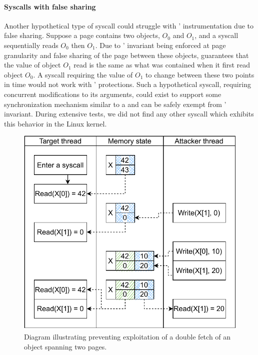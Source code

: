 \paragraph{Syscalls with false sharing}
Another hypothetical type of syscall could struggle with \midas'
instrumentation due to false sharing.
Suppose a page contains two objects, $O_0$ and $O_1$, and a syscall
sequentially reads $O_0$ then $O_1$.
Due to \midas' invariant being enforced at page granularity and
false sharing of the page between these objects, \midas guarantees that
the value of object $O_1$ read is the same as what was contained when it
first read object $O_0$.
A syscall requiring the value of $O_1$ to change between these two
points in time would not work with \midas' protections.
Such a hypothetical syscall, requiring concurrent modifications to its
arguments, could exist to support some synchronization mechanism
similar to a  and can be safely exempt from \midas' invariant.
%
During extensive tests, we did not find any other syscall which exhibits this behavior in the
Linux kernel.


\begin{figure}[]
  \centering
  \includegraphics[width=\linewidth]{media/midas/doublefetch_midas_twopages.pdf}
  \caption{Diagram illustrating \midas preventing exploitation
  of a double fetch of an object  spanning two pages.}
  \label{fig:copy_two_pages}
\end{figure}


